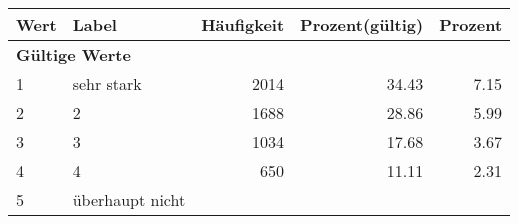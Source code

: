      \begin{longtable}{lXrrr}
     \toprule
     \textbf{Wert} & \textbf{Label} & \textbf{Häufigkeit} & \textbf{Prozent(gültig)} & \textbf{Prozent} \\
     \endhead
     \midrule
     \multicolumn{5}{l}{\textbf{Gültige Werte}}\\

     1 &
     \multicolumn{1}{X}{ sehr stark   } &


       \num{2014} &
       \num[round-mode=places,round-precision=2]{34,43} &
         \num[round-mode=places,round-precision=2]{7,15} \\

     2 &
     \multicolumn{1}{X}{ 2   } &


       \num{1688} &
       \num[round-mode=places,round-precision=2]{28,86} &
         \num[round-mode=places,round-precision=2]{5,99} \\

     3 &
     \multicolumn{1}{X}{ 3   } &


       \num{1034} &
       \num[round-mode=places,round-precision=2]{17,68} &
         \num[round-mode=places,round-precision=2]{3,67} \\

     4 &
     \multicolumn{1}{X}{ 4   } &


       \num{650} &
       \num[round-mode=places,round-precision=2]{11,11} &
         \num[round-mode=places,round-precision=2]{2,31} \\

     5 &
     \multicolumn{1}{X}{ überhaupt nicht   } &



\end{longtable}
